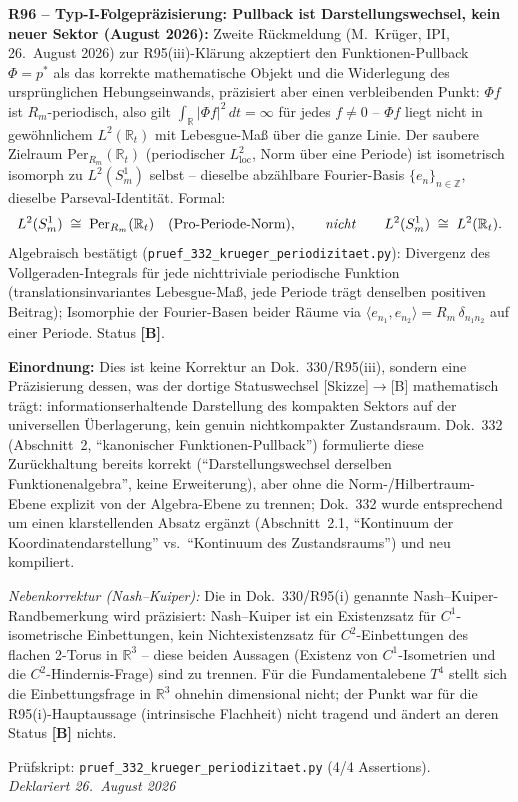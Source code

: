 \medskip

\textbf{R96 -- Typ-I-Folgepräzisierung: Pullback ist Darstellungswechsel, kein neuer Sektor (August 2026):}
Zweite Rückmeldung (M.~Krüger, IPI, 26.~August 2026) zur R95(iii)-Klärung
akzeptiert den Funktionen-Pullback $\Phi=p^*$ als das korrekte mathematische
Objekt und die Widerlegung des ursprünglichen Hebungseinwands, präzisiert
aber einen verbleibenden Punkt: $\Phi f$ ist $R_m$-periodisch, also gilt
$\int_{\mathbb{R}} |\Phi f|^2\,dt = \infty$ für jedes $f\neq0$ -- $\Phi f$
liegt nicht in gewöhnlichem $L^2(\mathbb{R}_t)$ mit Lebesgue-Maß über die
ganze Linie. Der saubere Zielraum $\mathrm{Per}_{R_m}(\mathbb{R}_t)$
(periodischer $L^2_\mathrm{loc}$, Norm über eine Periode) ist isometrisch
isomorph zu $L^2(S^1_m)$ selbst -- dieselbe abzählbare Fourier-Basis
$\{e_n\}_{n\in\mathbb{Z}}$, dieselbe Parseval-Identität. Formal:
\[
L^2(S^1_m) \;\cong\; \mathrm{Per}_{R_m}(\mathbb{R}_t)
\quad\text{(Pro-Periode-Norm)},
\qquad\text{\emph{nicht}}\qquad
L^2(S^1_m) \;\cong\; L^2(\mathbb{R}_t).
\]
Algebraisch bestätigt (\texttt{pruef\_332\_krueger\_periodizitaet.py}):
Divergenz des Vollgeraden-Integrals für jede nichttriviale periodische
Funktion (translationsinvariantes Lebesgue-Maß, jede Periode trägt
denselben positiven Beitrag); Isomorphie der Fourier-Basen beider Räume
via $\langle e_{n_1},e_{n_2}\rangle=R_m\,\delta_{n_1 n_2}$ auf einer Periode.
Status \textbf{[B]}.

\textbf{Einordnung:} Dies ist keine Korrektur an Dok.~330/R95(iii), sondern
eine Präzisierung dessen, was der dortige Statuswechsel [Skizze]$\to$[B]
mathematisch trägt: informationserhaltende Darstellung des kompakten
Sektors auf der universellen Überlagerung, kein genuin nichtkompakter
Zustandsraum. Dok.~332 (Abschnitt~2, \enquote{kanonischer Funktionen-Pullback})
formulierte diese Zurückhaltung bereits korrekt (\enquote{Darstellungswechsel
derselben Funktionenalgebra}, keine Erweiterung), aber ohne die
Norm-/Hilbertraum-Ebene explizit von der Algebra-Ebene zu trennen; Dok.~332
wurde entsprechend um einen klarstellenden Absatz ergänzt (Abschnitt~2.1,
\enquote{Kontinuum der Koordinatendarstellung} vs.\ \enquote{Kontinuum des
Zustandsraums}) und neu kompiliert.

\emph{Nebenkorrektur (Nash--Kuiper):} Die in Dok.~330/R95(i) genannte
Nash--Kuiper-Randbemerkung wird präzisiert: Nash--Kuiper ist ein
Existenzsatz für $C^1$-isometrische Einbettungen, kein Nichtexistenzsatz
für $C^2$-Einbettungen des flachen 2-Torus in $\mathbb{R}^3$ -- diese
beiden Aussagen (Existenz von $C^1$-Isometrien und die $C^2$-Hindernis-Frage)
sind zu trennen. Für die Fundamentalebene $T^4$ stellt sich die
Einbettungsfrage in $\mathbb{R}^3$ ohnehin dimensional nicht; der Punkt
war für die R95(i)-Hauptaussage (intrinsische Flachheit) nicht tragend
und ändert an deren Status \textbf{[B]} nichts.

Prüfskript: \texttt{pruef\_332\_krueger\_periodizitaet.py} (4/4 Assertions).\\
\emph{Deklariert 26.~August 2026}

\medskip
